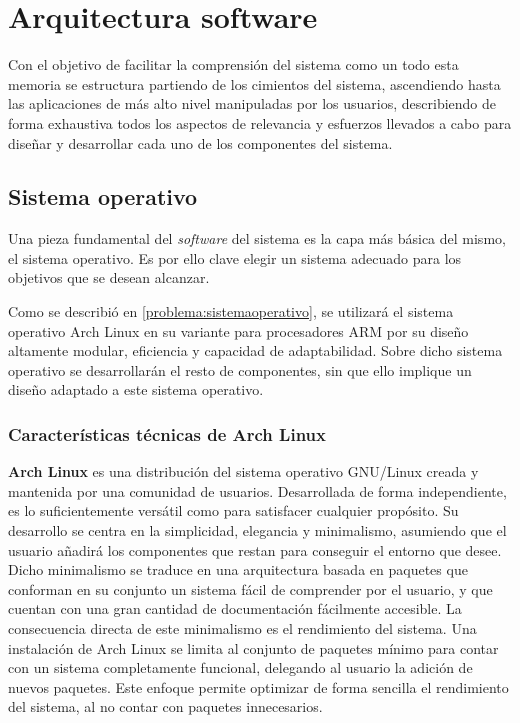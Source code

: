 \chapter{Arquitectura software}

Con el objetivo de facilitar la comprensión del sistema como un todo esta memoria se estructura partiendo de los cimientos del sistema, ascendiendo hasta las aplicaciones de más alto nivel manipuladas por los usuarios, describiendo de forma exhaustiva todos los aspectos de relevancia y esfuerzos llevados a cabo para diseñar y desarrollar cada uno de los componentes del sistema.

\section{Sistema operativo}

Una pieza fundamental del \textit{software} del sistema es la capa más básica del mismo, el sistema operativo. Es por ello clave elegir un sistema adecuado para los objetivos que se desean alcanzar.

Como se describió en \ref{problema:sistemaoperativo}, se utilizará el sistema operativo Arch Linux en su variante para procesadores ARM por su diseño altamente modular, eficiencia y capacidad de adaptabilidad. Sobre dicho sistema operativo se desarrollarán el resto de componentes, sin que ello implique un diseño adaptado a este sistema operativo.

\subsection{Características técnicas de Arch Linux}
\label{archlinux:description}

\textbf{Arch Linux} es una distribución del sistema operativo GNU/Linux creada y mantenida por una comunidad de usuarios. Desarrollada de forma independiente, es lo suficientemente versátil como para satisfacer cualquier propósito. Su desarrollo se centra en la simplicidad, elegancia y minimalismo, asumiendo que el usuario añadirá los componentes que restan para conseguir el entorno que desee. Dicho minimalismo se traduce en una arquitectura basada en paquetes que conforman en su conjunto un sistema fácil de comprender por el usuario, y que cuentan con una gran cantidad de documentación fácilmente accesible. La consecuencia directa de este minimalismo es el rendimiento del sistema. Una instalación de Arch Linux se limita al conjunto de paquetes mínimo para contar con un sistema completamente funcional, delegando al usuario la adición de nuevos paquetes. Este enfoque permite optimizar de forma sencilla el rendimiento del sistema, al no contar con paquetes innecesarios.

